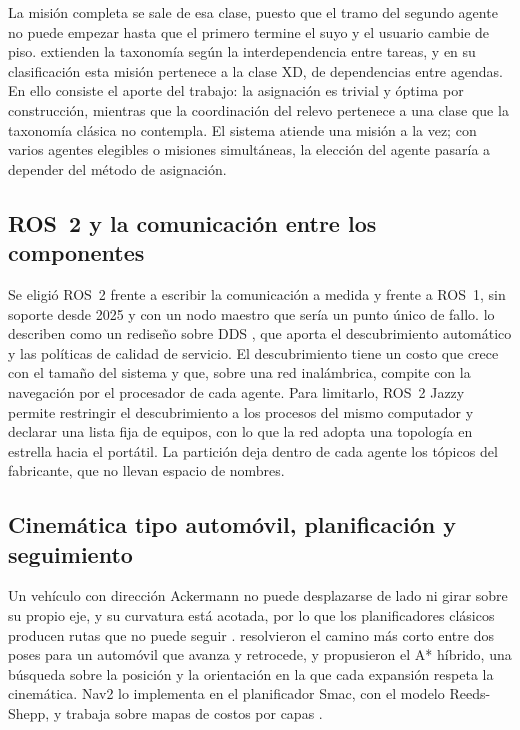 La misión completa se sale de esa clase, puesto que el tramo del segundo agente no puede empezar hasta que el primero termine el suyo y el usuario cambie de piso. \textcite{korsah2013comprehensive} extienden la taxonomía según la interdependencia entre tareas, y en su clasificación esta misión pertenece a la clase XD, de dependencias entre agendas. En ello consiste el aporte del trabajo: la asignación es trivial y óptima por construcción, mientras que la coordinación del relevo pertenece a una clase que la taxonomía clásica no contempla. El sistema atiende una misión a la vez; con varios agentes elegibles o misiones simultáneas, la elección del agente pasaría a depender del método de asignación.

\subsection{ROS~2 y la comunicación entre los componentes}

Se eligió ROS~2 frente a escribir la comunicación a medida y frente a ROS~1, sin soporte desde 2025 y con un nodo maestro que sería un punto único de fallo. \textcite{macenski2022ros2} lo describen como un rediseño sobre DDS \autocite{omg2015dds}, que aporta el descubrimiento automático y las políticas de calidad de servicio. El descubrimiento tiene un costo que crece con el tamaño del sistema y que, sobre una red inalámbrica, compite con la navegación por el procesador de cada agente. Para limitarlo, ROS~2 Jazzy permite restringir el descubrimiento a los procesos del mismo computador y declarar una lista fija de equipos, con lo que la red adopta una topología en estrella hacia el portátil. La partición deja dentro de cada agente los tópicos del fabricante, que no llevan espacio de nombres.

\subsection{Cinemática tipo automóvil, planificación y seguimiento}

Un vehículo con dirección Ackermann no puede desplazarse de lado ni girar sobre su propio eje, y su curvatura está acotada, por lo que los planificadores clásicos producen rutas que no puede seguir \autocite{macenski2024smac}. \textcite{reeds1990optimal} resolvieron el camino más corto entre dos poses para un automóvil que avanza y retrocede, y \textcite{dolgov2010path} propusieron el A* híbrido, una búsqueda sobre la posición y la orientación en la que cada expansión respeta la cinemática. Nav2 \autocite{macenski2020marathon} lo implementa en el planificador Smac, con el modelo Reeds-Shepp, y trabaja sobre mapas de costos por capas \autocite{macenski2023survey}.

